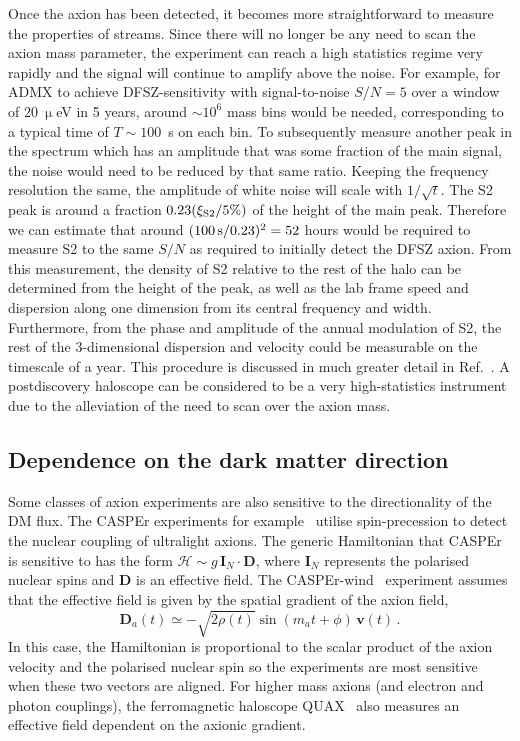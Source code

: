 \documentclass[prd,10pt,twocolumn,showpacs,nofootinbib,aps,superscriptaddress,preprintnumbers]{revtex4-1}
\begin{document}
Once the axion has been detected, it becomes more straightforward to
measure the properties of streams. Since there will no longer be any
need to scan the axion mass parameter, the experiment can reach a
high statistics regime very rapidly and the signal will continue to
amplify above the noise. For example, for ADMX to achieve
 DFSZ-sensitivity with signal-to-noise $S/N=5$ over a
window of $20~\upmu$eV in 5 years, around $\sim10^6$ mass bins would
be needed, corresponding to a typical time of $T\sim100$~s on each
bin. To subsequently measure another peak in the spectrum which has an
amplitude that was some fraction of the main signal, the noise would need
to be reduced by that same ratio. Keeping the frequency resolution
the same, the amplitude of white noise will scale with
$1/\sqrt{t}$. The S2 peak is around a fraction $0.23(\xi_{\rm
  S2}/5\%)$ of the height of the main peak. Therefore we can estimate
that around $(100\,{\rm s}/0.23)^2 = 52$ hours would be required to
measure S2 to the same $S/N$ as required to initially detect the DFSZ
axion. From this measurement, the density of S2
relative to the rest of the halo can be determined from the
height of the peak, as well
as the lab frame speed and dispersion along one dimension from its
central frequency and width.
Furthermore, from the phase and amplitude of the
annual modulation of S2, the rest of the 3-dimensional dispersion and
velocity could be measurable on the timescale of a year. This procedure
is discussed in much greater detail in Ref.~\cite{Knirck:2018knd}.
A postdiscovery haloscope can be considered to be a very high-statistics 
instrument due to the alleviation of the need to scan over the axion mass.

 \subsection{Dependence on the dark matter direction}\label{sec:axiondirection}

 Some classes of axion experiments are also sensitive to the directionality of
  the DM flux.  The CASPEr experiments for example~\cite{Budker:2013hfa}
  utilise spin-precession to detect the nuclear coupling of
  ultralight axions.  The generic Hamiltonian that CASPEr is sensitive
  to has the form $\mathcal{H} \sim g\, \mathbf{I}_N \cdot \mathbf{D}$,
  where $\mathbf{I}_N$ represents the polarised nuclear spins and
  $\mathbf{D}$ is an effective field.  The
  CASPEr-wind~\cite{Garcon:2019inh} experiment assumes that the
  effective field is given by the spatial gradient of the axion field,
  \begin{equation}
  \mathbf{D}_a(t) \simeq -\sqrt{2\rho(t)} \sin(m_a t + \phi) \, \mathbf{v}(t) \, .
  \end{equation}
  In this case, the Hamiltonian is proportional to the scalar product of
  the axion velocity and the polarised nuclear spin so the experiments
  are most sensitive when these two vectors are aligned. For higher mass axions (and electron and photon couplings), the ferromagnetic haloscope QUAX~\cite{Crescini:2018qrz,Crescini:2016lwj,Barbieri:2016vwg,Barbieri:2016vwg} also measures an effective field dependent on the axionic gradient. 
  
\end{document}
